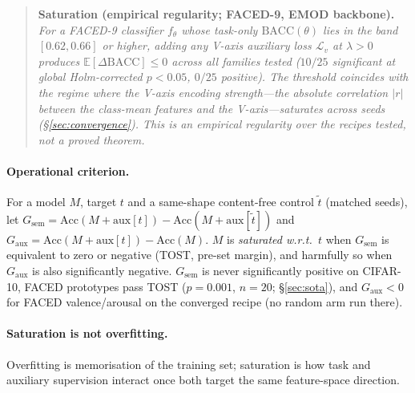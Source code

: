 \begin{quote}
\textbf{Saturation (empirical regularity; FACED-9, EMOD backbone).}
\emph{For a FACED-9 classifier $f_\theta$ whose task-only
$\mathrm{BACC}(\theta)$ lies in the band $[0.62, 0.66]$ or higher, adding
any V-axis auxiliary loss $\mathcal{L}_v$ at $\lambda > 0$ produces
$\mathbb{E}[\Delta\mathrm{BACC}] \leq 0$ across all families tested
($10/25$ significant at global Holm-corrected $p<0.05$, $0/25$ positive). The threshold
coincides with the regime where the V-axis encoding strength---the
absolute correlation $|r|$ between the class-mean features and the
V-axis---saturates across seeds (\S\ref{sec:convergence}). This is an
empirical regularity over the recipes tested, not a proved theorem.}
\end{quote}

\begin{revblock}
\paragraph{Operational criterion.} For a model $M$, target $t$ and a
same-shape content-free control $\tilde t$ (matched seeds), let
$G_{\mathrm{sem}}{=}\mathrm{Acc}(M{+}\mathrm{aux}[t]){-}\mathrm{Acc}(M{+}\mathrm{aux}[\tilde t])$
and $G_{\mathrm{aux}}{=}\mathrm{Acc}(M{+}\mathrm{aux}[t]){-}\mathrm{Acc}(M)$. $M$ is
\emph{saturated w.r.t.\ $t$} when $G_{\mathrm{sem}}$ is equivalent to zero or negative
(TOST, pre-set margin), and harmfully so when $G_{\mathrm{aux}}$ is also significantly
negative. $G_{\mathrm{sem}}$ is never significantly positive on CIFAR-10, FACED
prototypes pass TOST ($p{=}0.001$, $n{=}20$; \S\ref{sec:sota}), and $G_{\mathrm{aux}}{<}0$
for FACED valence/arousal on the converged recipe (no random arm run there).
\end{revblock}

\paragraph{Saturation is not overfitting.} Overfitting is memorisation
of the training set; saturation is how task and auxiliary supervision
interact once both target the same feature-space direction.


